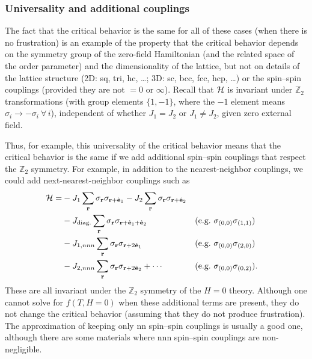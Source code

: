 \subsubsection*{Universality and additional couplings}

The fact that the critical behavior is the same for all of these cases (when there is no frustration)
is an example of the property that the critical behavior depends on the symmetry group of the
zero-field Hamiltonian (and the related space of the order parameter) and the dimensionality of the
lattice, but not on details of the lattice structure (2D: sq, tri, hc, \ldots; 3D: sc, bcc, fcc, hcp,
\ldots) or the spin--spin couplings (provided they are not $=0$ or $\infty$). Recall that $\mathcal{H}$ is
invariant under $\mathbb{Z}_2$ transformations (with group elements $\{1,-1\}$, where the $-1$ element
means $\sigma_i\to-\sigma_i\ \forall\,i$), independent of whether $J_1 = J_2$ or $J_1\ne J_2$, given zero
external field.

Thus, for example, this universality of the critical behavior means that the critical behavior is the
same if we add additional spin--spin couplings that respect the $\mathbb{Z}_2$ symmetry. For example,
in addition to the nearest-neighbor couplings, we could add next-nearest-neighbor couplings such as
\begin{align}
  \Ham = &-J_1\sum_{\mathbf r}\sigma_{\mathbf r}\sigma_{\mathbf r+\hat{\mathbf e}_1}
          - J_2\sum_{\mathbf r}\sigma_{\mathbf r}\sigma_{\mathbf r+\hat{\mathbf e}_2}\nonumber\\
         &- J_{\text{diag.}}\sum_{\mathbf r}\sigma_{\mathbf r}\sigma_{\mathbf r+\hat{\mathbf e}_1+\hat{\mathbf e}_2}
          &&\text{(e.g.\ }\sigma_{(0,0)}\sigma_{(1,1)})\nonumber\\
         &- J_{1,nnn}\sum_{\mathbf r}\sigma_{\mathbf r}\sigma_{\mathbf r+2\hat{\mathbf e}_1}
          &&\text{(e.g.\ }\sigma_{(0,0)}\sigma_{(2,0)})\nonumber\\
         &- J_{2,nnn}\sum_{\mathbf r}\sigma_{\mathbf r}\sigma_{\mathbf r+2\hat{\mathbf e}_2} + \cdots
          &&\text{(e.g.\ }\sigma_{(0,0)}\sigma_{(0,2)}).
\end{align}
These are all invariant under the $\mathbb{Z}_2$ symmetry of the $H = 0$ theory. Although one cannot
solve for $f(T,H=0)$ when these additional terms are present, they do not change the critical behavior
(assuming that they do not produce frustration). The approximation of keeping only nn spin--spin
couplings is usually a good one, although there are some materials where nnn spin--spin couplings are
non-negligible.


